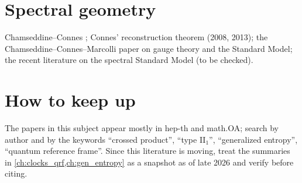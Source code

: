 \section{Spectral geometry}
Chamseddine--Connes \cite{CCM}; Connes' reconstruction theorem (2008, 2013); the Chamseddine--Connes--Marcolli paper on gauge theory and the Standard Model; the recent literature on the spectral Standard Model (to be checked).

\section{How to keep up}
The papers in this subject appear mostly in hep-th and math.OA; search by author and by the keywords ``crossed product'', ``type II$_1$'', ``generalized entropy'', ``quantum reference frame''. Since this literature is moving, treat the summaries in \cref{ch:clocks_qrf,ch:gen_entropy} as a snapshot as of late 2026 and verify before citing.
